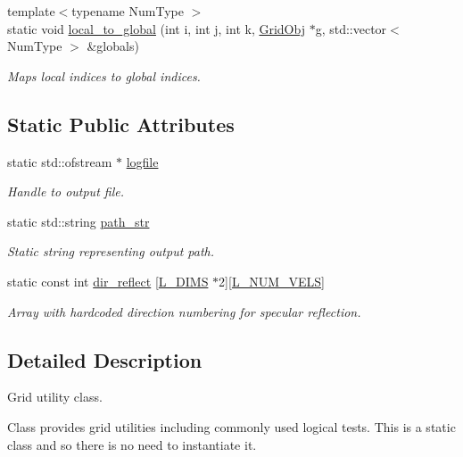 \begin{DoxyCompactItemize}
{\footnotesize template$<$typename Num\+Type $>$ }\\static void \hyperlink{class_grid_utils_ac3e122b19b2ee0e159b3025b2858d895}{local\+\_\+to\+\_\+global} (int i, int j, int k, \hyperlink{class_grid_obj}{Grid\+Obj} $\ast$g, std\+::vector$<$ Num\+Type $>$ \&globals)
\begin{DoxyCompactList}\small\item\em Maps local indices to global indices. \end{DoxyCompactList}\end{DoxyCompactItemize}
\subsection*{Static Public Attributes}
\begin{DoxyCompactItemize}
\item 
static std\+::ofstream $\ast$ \hyperlink{class_grid_utils_a298239096e929c1ba4eba925e351c1b3}{logfile}
\begin{DoxyCompactList}\small\item\em Handle to output file. \end{DoxyCompactList}\item 
static std\+::string \hyperlink{class_grid_utils_a9b58748e9e05e84852962d7abc7942e3}{path\+\_\+str}
\begin{DoxyCompactList}\small\item\em Static string representing output path. \end{DoxyCompactList}\item 
static const int \hyperlink{class_grid_utils_ae2b566735d973bc25f1a6416010efa70}{dir\+\_\+reflect} \mbox{[}\hyperlink{definitions_8h_a31d5945080ee5c34edc32e6f74c724c8}{L\+\_\+\+D\+I\+MS} $\ast$2\mbox{]}\mbox{[}\hyperlink{definitions_8h_a947c7e248feb63ae57fb828c03c4c001}{L\+\_\+\+N\+U\+M\+\_\+\+V\+E\+LS}\mbox{]}
\begin{DoxyCompactList}\small\item\em Array with hardcoded direction numbering for specular reflection. \end{DoxyCompactList}\end{DoxyCompactItemize}


\subsection{Detailed Description}
Grid utility class. 

Class provides grid utilities including commonly used logical tests. This is a static class and so there is no need to instantiate it. 

